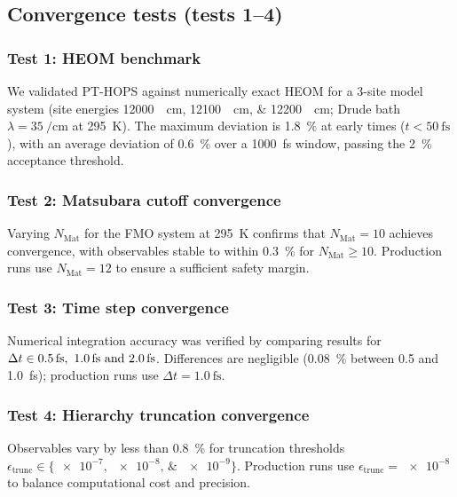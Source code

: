 \documentclass[11pt,a4paper]{article}
\begin{document}
\subsection{Convergence tests (tests 1--4)}

\subsubsection{Test 1: HEOM benchmark}

We validated PT-HOPS against numerically exact HEOM for a 3-site model system (site energies \SIlist{12000;12100;12200}{\per\cm}; Drude bath $\lambda = \SI{35}{\per\cm}$ at \SI{295}{\kelvin}). The maximum deviation is \SI{1.8}{\percent} at early times ($t < \SI{50}{\femto\second}$), with an average deviation of \SI{0.6}{\percent} over a \SI{1000}{\femto\second} window, passing the \SI{2}{\percent} acceptance threshold.

\subsubsection{Test 2: Matsubara cutoff convergence}

Varying $N_{\mathrm{Mat}}$ for the FMO system at \SI{295}{\kelvin} confirms that $N_{\mathrm{Mat}} = 10$ achieves convergence, with observables stable to within \SI{0.3}{\percent} for $N_{\mathrm{Mat}} \geq 10$. Production runs use $N_{\mathrm{Mat}} = 12$ to ensure a sufficient safety margin.

\subsubsection{Test 3: Time step convergence}

Numerical integration accuracy was verified by comparing results for $\Delta t \in \SIlist{0.5;1.0;2.0}{\femto\second}$. Differences are negligible (\SI{0.08}{\percent} between \num{0.5} and \SI{1.0}{\femto\second}); production runs use $\Delta t = \SI{1.0}{\femto\second}$.

\subsubsection{Test 4: Hierarchy truncation convergence}

Observables vary by less than \SI{0.8}{\percent} for truncation thresholds $\epsilon_{\mathrm{trunc}} \in \{\numlist{e-7;e-8;e-9}\}$. Production runs use $\epsilon_{\mathrm{trunc}} = \num{e-8}$ to balance computational cost and precision.
\end{document}
